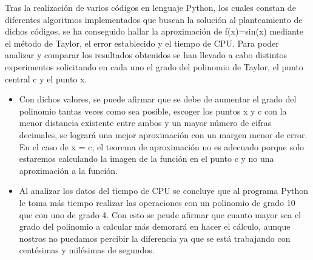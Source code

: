
 Tras la realizaci\'on de varios c\'odigos en lenguaje Python, los cuales constan de diferentes algoritmos implementados que buscan la soluci\'on al 
planteamiento de dichos c\'odigos, se ha conseguido hallar la aproximaci\'on de f(x)=sin(x) mediante el m\'etodo de Taylor, el error establecido y el tiempo de CPU. 
Para poder analizar y comparar los resultados obtenidos se han llevado a cabo distintos experimentos solicitando en cada uno el grado del polinomio de Taylor,
 el punto central c y el punto x. 

\begin{itemize}
\item
Con dichos valores, se puede afirmar que se debe de aumentar el grado del polinomio tantas veces como sea posible, escoger los puntos x y c con la menor distancia 
existente entre ambos y un mayor n\'umero de cifras decimales, se lograr\'a una mejor aproximaci\'on con un margen menor de error.
En el caso de x = c, el teorema de aproximaci\'on no es adecuado porque solo estaremos calculando la imagen de la funci\'on en el punto c y no una 
aproximaci\'on a la funci\'on.


\item
Al analizar los datos del tiempo de CPU se concluye que al programa Python le toma m\'as tiempo realizar las operaciones con un polinomio de grado 10 que con 
uno de grado 4. Con esto se peude afirmar que cuanto mayor sea el grado del polinomio a calcular m\'as demorar\'a en hacer el c\'alculo, aunque nostros no 
puedamos percibir la diferencia ya que se est\'a trabajando con cent\'esimas y mil\'esimas de segundos. 

\end{itemize}
